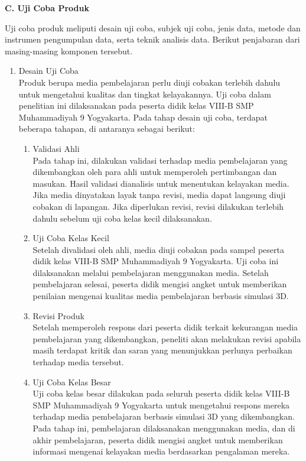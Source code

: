 \textbf{C. Uji Coba Produk}

\hspace*{1cm}Uji coba produk meliputi desain uji coba, subjek uji coba, jenis data, metode dan instrumen pengumpulan data, serta teknik analisis data. Berikut penjabaran dari masing-masing komponen tersebut.
\begin{enumerate}
    \item Desain Uji Coba\\
    \hspace*{1cm}Produk berupa media pembelajaran perlu diuji cobakan terlebih dahulu untuk mengetahui kualitas dan tingkat kelayakannya. Uji coba dalam penelitian ini dilaksanakan pada peserta didik kelas VIII-B SMP Muhammadiyah 9 Yogyakarta. Pada tahap desain uji coba, terdapat beberapa tahapan, di antaranya sebagai berikut:
    \begin{enumerate}
        \item Validasi Ahli\\
        \hspace*{1cm}Pada tahap ini, dilakukan validasi terhadap media pembelajaran yang dikembangkan oleh para ahli untuk memperoleh pertimbangan dan masukan. Hasil validasi dianalisis untuk menentukan kelayakan media. Jika media dinyatakan layak tanpa revisi, media dapat langsung diuji cobakan di lapangan. Jika diperlukan revisi, revisi dilakukan terlebih dahulu sebelum uji coba kelas kecil dilaksanakan.
        \item Uji Coba Kelas Kecil\\
        \hspace*{1cm}Setelah divalidasi oleh ahli, media diuji cobakan pada sampel peserta didik kelas VIII-B SMP Muhammadiyah 9 Yogyakarta. Uji coba ini dilaksanakan melalui pembelajaran menggunakan media. Setelah pembelajaran selesai, peserta didik mengisi angket untuk memberikan penilaian mengenai kualitas media pembelajaran berbasis simulasi 3D.
        \item Revisi Produk\\
        \hspace*{1cm}Setelah memperoleh respons dari peserta didik terkait kekurangan media pembelajaran yang dikembangkan, peneliti akan melakukan revisi apabila masih terdapat kritik dan saran yang menunjukkan perlunya perbaikan terhadap media tersebut.
        \item Uji Coba Kelas Besar\\
        \hspace*{1cm}Uji coba kelas besar dilakukan pada seluruh peserta didik kelas VIII-B SMP Muhammadiyah 9 Yogyakarta untuk mengetahui respons mereka terhadap media pembelajaran berbasis simulasi 3D yang dikembangkan. Pada tahap ini, pembelajaran dilaksanakan menggunakan media, dan di akhir pembelajaran, peserta didik mengisi angket untuk memberikan informasi mengenai kelayakan media berdasarkan pengalaman mereka.
    \end{enumerate}


\end{enumerate}
